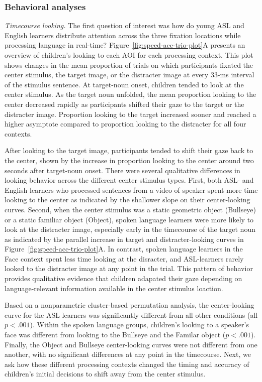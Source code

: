 \documentclass[,man,floatsintext]{apa6}
\begin{document}
\subsubsection{Behavioral analyses}\label{behavioral-analyses}

\emph{Timecourse looking.} The first question of interest was how do
young ASL and English learners distribute attention across the three
fixation locations while processing language in real-time?
Figure~\ref{fig:speed-acc-trio-plot}A presents an overview of children's
looking to each AOI for each processing context. This plot shows changes
in the mean proportion of trials on which participants fixated the
center stimulus, the target image, or the distracter image at every
33-ms interval of the stimulus sentence. At target-noun onset, children
tended to look at the center stimulus. As the target noun unfolded, the
mean proportion looking to the center decreased rapidly as participants
shifted their gaze to the target or the distracter image. Proportion
looking to the target increased sooner and reached a higher asymptote
compared to proportion looking to the distracter for all four contexts.

After looking to the target image, participants tended to shift their
gaze back to the center, shown by the increase in proportion looking to
the center around two seconds after target-noun onset. There were
several qualitative differences in looking behavior across the different
center stimulus types. First, both ASL- and English-learners who
processed sentences from a video of speaker spent more time looking to
the center as indicated by the shallower slope on their center-looking
curves. Second, when the center stimulus was a static geometric object
(Bullseye) or a static familiar object (Object), spoken language
learners were more likely to look at the distracter image, especially
early in the timecourse of the target noun as indicated by the parallel
increase in target and distracter-looking curves in
Figure~\ref{fig:speed-acc-trio-plot}A. In contrast, spoken language
learners in the Face context spent less time looking at the disracter,
and ASL-learners rarely looked to the distracter image at any point in
the trial. This pattern of behavior provides qualitative evidence that
children adapated their gaze depending on language-relevant information
available in the center stimulus loaction.

Based on a nonparametric cluster-based permutation analysis, the
center-looking curve for the ASL learners was significantly different
from all other conditions (all \(p < .001\)). Within the spoken language
groups, children's looking to a speaker's face was different from
looking to the Bullseye and the Familar object (\(p < .001\)). Finally,
the Object and Bullseye center-looking curves were not different from
one another, with no significant differences at any point in the
timecourse. Next, we ask how these different processing contexts changed
the timing and accuracy of children's initial decisions to shift away
from the center stimulus.
\end{document}
